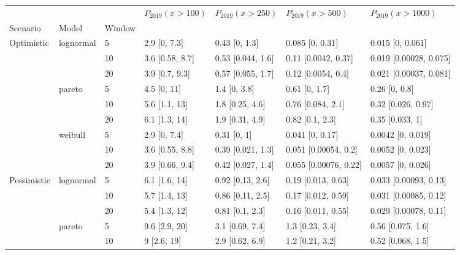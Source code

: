 \begin{tabular}{lllllll}
\toprule
           &         &    & $P_{2019}(x>100)$ &  $P_{2019}(x>250)$ &      $P_{2019}(x>500)$ &       $P_{2019}(x>1000)$ \\
Scenario & Model & Window &                   &                    &                        &                          \\
\midrule
Optimistic & lognormal & 5  &      2.9 [0, 7.3] &      0.43 [0, 1.3] &        0.085 [0, 0.31] &         0.015 [0, 0.061] \\
           &         & 10 &   3.6 [0.58, 8.7] &  0.53 [0.044, 1.6] &    0.11 [0.0042, 0.37] &   0.019 [0.00028, 0.075] \\
           &         & 20 &    3.9 [0.7, 9.3] &  0.57 [0.055, 1.7] &     0.12 [0.0054, 0.4] &   0.021 [0.00037, 0.081] \\
           & pareto & 5  &       4.5 [0, 11] &       1.4 [0, 3.8] &          0.61 [0, 1.7] &            0.26 [0, 0.8] \\
           &         & 10 &     5.6 [1.1, 13] &    1.8 [0.25, 4.6] &      0.76 [0.084, 2.1] &       0.32 [0.026, 0.97] \\
           &         & 20 &     6.1 [1.3, 14] &    1.9 [0.31, 4.9] &        0.82 [0.1, 2.3] &          0.35 [0.033, 1] \\
           & weibull & 5  &      2.9 [0, 7.4] &        0.31 [0, 1] &        0.041 [0, 0.17] &        0.0042 [0, 0.019] \\
           &         & 10 &   3.6 [0.55, 8.8] &  0.39 [0.021, 1.3] &   0.051 [0.00054, 0.2] &        0.0052 [0, 0.023] \\
           &         & 20 &   3.9 [0.66, 9.4] &  0.42 [0.027, 1.4] &  0.055 [0.00076, 0.22] &        0.0057 [0, 0.026] \\
Pessimistic & lognormal & 5  &     6.1 [1.6, 14] &   0.92 [0.13, 2.6] &     0.19 [0.013, 0.63] &    0.033 [0.00093, 0.13] \\
           &         & 10 &     5.7 [1.4, 13] &   0.86 [0.11, 2.5] &     0.17 [0.012, 0.59] &    0.031 [0.00085, 0.12] \\
           &         & 20 &     5.4 [1.3, 12] &    0.81 [0.1, 2.3] &     0.16 [0.011, 0.55] &    0.029 [0.00078, 0.11] \\
           & pareto & 5  &     9.6 [2.9, 20] &    3.1 [0.69, 7.4] &        1.3 [0.23, 3.4] &        0.56 [0.075, 1.6] \\
           &         & 10 &       9 [2.6, 19] &    2.9 [0.62, 6.9] &        1.2 [0.21, 3.2] &        0.52 [0.068, 1.5] \\

\end{tabular}

